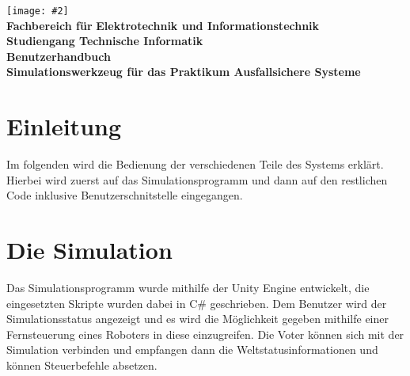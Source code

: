 \documentclass[
    12pt,
    bibliography=totoc,
    ngerman,
    enabledeprecatedfontcommands
]{scrartcl}
\newcommand{\includevisio}[2][]{\texttt{[image: \#2]}}
\begin{document}


\thispagestyle{empty}
\begin{center}
	\includevisio[width=\textwidth]{fhlogo}\\
	\large
	\textbf{Fachbereich f{\"{u}r}}
	\textbf{Elektrotechnik und Informationstechnik}\\
	\large
	\textbf{Studiengang Technische Informatik}\\
	\vspace*{3cm}
	\LARGE
	\textbf{Benutzerhandbuch}\\
	\Huge
	\vspace*{1cm}
	\textsf{\textbf{Simulationswerkzeug f{\"{u}}r das Praktikum Ausfallsichere Systeme}}\\
	\vspace*{3cm}
	
	\vfill
	\normalsize
\end{center}
\pagebreak

\section{Einleitung}
Im folgenden wird die Bedienung der verschiedenen Teile des Systems erkl{\"{a}}rt. Hierbei wird zuerst auf das Simulationsprogramm und dann auf
den restlichen Code inklusive Benutzerschnitstelle eingegangen.

\section{Die Simulation}
Das Simulationsprogramm wurde mithilfe der Unity Engine entwickelt, die eingesetzten Skripte wurden
dabei in C\# geschrieben. Dem Benutzer wird der Simulationsstatus angezeigt und es wird die M{\"{o}}glichkeit
gegeben mithilfe einer Fernsteuerung eines Roboters in diese einzugreifen. Die Voter k{\"{o}}nnen sich
mit der Simulation verbinden und empfangen dann die Weltstatusinformationen und k{\"{o}}nnen Steuerbefehle
absetzen.
\end{document}
